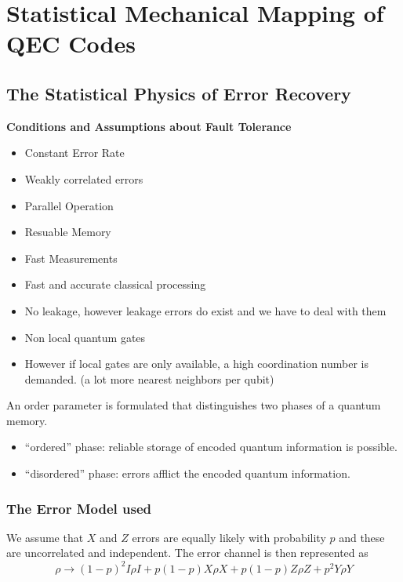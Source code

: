 \chapter{Statistical Mechanical Mapping of QEC Codes}\label{ch:statmechmapping}

\section{The Statistical Physics of Error Recovery}\label{sec:ft-conditions}
\textbf{Conditions and Assumptions about Fault Tolerance}\cite{dlkp2002}
\begin{itemize}
    \item Constant Error Rate
    \item Weakly correlated errors
    \item Parallel Operation
    \item Resuable Memory
    \item Fast Measurements
    \item Fast and accurate classical processing
    \item No leakage, however leakage errors do exist and we have to deal with them
    \item Non local quantum gates
    \item However if local gates are only available, a high coordination number is demanded. (a lot more nearest neighbors per qubit)
\end{itemize}

An order parameter is formulated that distinguishes two phases of a quantum memory. 
\begin{itemize}
    \item ``ordered'' phase: reliable storage of encoded quantum information is possible.
    \item ``disordered'' phase: errors afflict the encoded quantum information.
\end{itemize}

\subsection*{The Error Model used}
We assume that \(X\) and \(Z\) errors are equally likely with probability \(p\) and these are uncorrelated and independent. The error channel is then represented as 
\begin{equation}
    \rho \rightarrow (1-p)^2 I \rho I + p(1-p)X \rho X + p(1-p)Z\rho Z+ p^2Y \rho Y
\end{equation}

